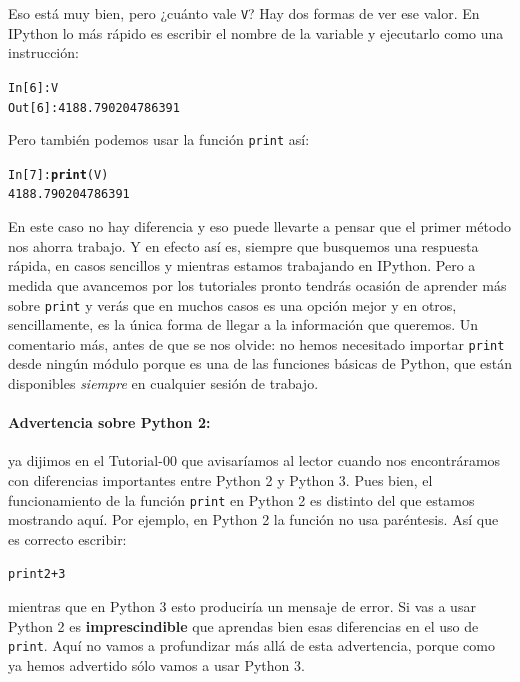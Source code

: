 \documentclass[10pt,a4paper]{article}\usepackage[]{graphicx}\usepackage[]{color}
\makeatletter
\newcommand{\hlnum}[1]{\textcolor[rgb]{0.686,0.059,0.569}{#1}}%
\newcommand{\hlopt}[1]{\textcolor[rgb]{0,0,0}{#1}}%
\newcommand{\hlstd}[1]{\textcolor[rgb]{0.345,0.345,0.345}{#1}}%
\newcommand{\hlkwd}[1]{\textcolor[rgb]{0.737,0.353,0.396}{\textbf{#1}}}%
\newenvironment{kframe}{%
 \def\at@end@of@kframe{}%
 \ifinner\ifhmode%
  \def\at@end@of@kframe{\end{minipage}}%
  \begin{minipage}{\columnwidth}%
 \fi\fi%
 \def\FrameCommand##1{\hskip\@totalleftmargin \hskip-\fboxsep
 \colorbox{shadecolor}{##1}\hskip-\fboxsep
     \hskip-\linewidth \hskip-\@totalleftmargin \hskip\columnwidth}%
 \MakeFramed {\advance\hsize-\width
   \@totalleftmargin\z@ \linewidth\hsize
   \@setminipage}}%
 {\par\unskip\endMakeFramed%
 \at@end@of@kframe}
\newenvironment{knitrout}{}{} %
\newcounter {cont01}
\makeatother
\begin{document}
Eso está muy bien, pero ¿cuánto vale {\tt V}? Hay dos formas de ver ese valor. En IPython lo más rápido es escribir el nombre de la variable y ejecutarlo como una instrucción:
\begin{knitrout}
\color{fgcolor}\begin{kframe}
\begin{alltt}
\hlstd{In [}\hlnum{6}\hlstd{]}\hlopt{:} \hlstd{V}
\hlstd{Out[}\hlnum{6}\hlstd{]}\hlopt{:} \hlnum{4188.790204786391}
\end{alltt}
\end{kframe}
\end{knitrout}
Pero también podemos usar la función {\tt print} así:
\begin{knitrout}
\color{fgcolor}\begin{kframe}
\begin{alltt}
\hlstd{In [}\hlnum{7}\hlstd{]}\hlopt{:} \hlkwd{print}\hlstd{(V)}
\hlnum{4188.790204786391}
\end{alltt}
\end{kframe}
\end{knitrout}
En este caso no hay diferencia y eso puede llevarte a pensar que el primer método nos ahorra trabajo. Y en efecto así es, siempre que busquemos una respuesta rápida, en casos sencillos y mientras estamos trabajando en IPython. Pero a medida que avancemos por los tutoriales pronto tendrás ocasión de aprender más sobre {\tt print} y verás que en muchos casos es una opción mejor y en otros, sencillamente, es la única forma de llegar a la información que queremos. Un comentario más, antes de que se nos olvide: no hemos necesitado importar {\tt print} desde ningún  módulo porque es una de las funciones básicas de Python, que están disponibles {\em siempre} en cualquier sesión de trabajo.

\paragraph{Advertencia sobre Python 2:} ya dijimos en el Tutorial-00 que avisaríamos al lector cuando nos encontráramos con diferencias importantes entre Python 2 y Python 3. Pues bien, el funcionamiento de la función {\tt print} en Python 2 es distinto del que estamos mostrando aquí. Por ejemplo, en Python 2 la función no usa paréntesis. Así que es correcto escribir:
\begin{knitrout}
\color{fgcolor}\begin{kframe}
\begin{alltt}
print 2 + 3
\end{alltt}
\end{kframe}
\end{knitrout}
mientras que en Python 3 esto produciría un mensaje de error. Si vas a usar Python 2 es {\bf imprescindible} que aprendas bien esas diferencias en el uso de {\tt print}. Aquí no vamos a profundizar más allá de esta advertencia, porque como ya hemos advertido sólo vamos a usar Python 3. 
\end{document}
